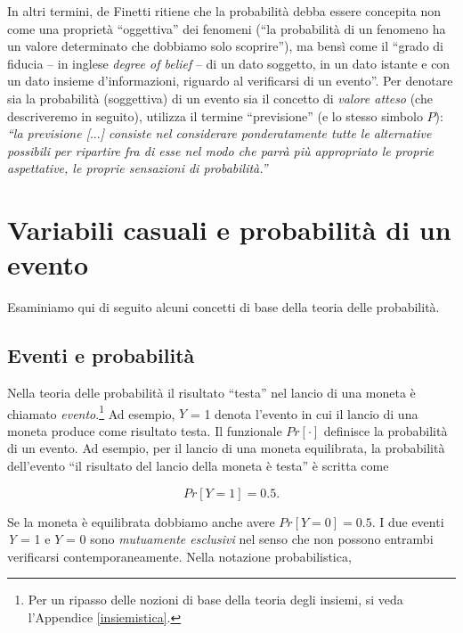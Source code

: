 \documentclass[
  11pt,
]{krantz}
\theoremstyle{definition}
\theoremstyle{definition}
\theoremstyle{definition}
\theoremstyle{definition}
\theoremstyle{remark}
\begin{document}
In altri termini, de Finetti ritiene che la probabilità debba essere concepita non come una proprietà ``oggettiva'' dei fenomeni (``la probabilità di un fenomeno ha un valore determinato che dobbiamo solo scoprire''), ma bensì come il ``grado di fiducia -- in inglese \emph{degree of belief} -- di un dato soggetto, in un dato istante e con un dato insieme d'informazioni, riguardo al verificarsi di un evento''. Per denotare sia la probabilità (soggettiva) di un evento sia il concetto di \emph{valore atteso} (che descriveremo in seguito), \citet{definetti1970teoria} utilizza il termine ``previsione'' (e lo stesso simbolo \(P\)): \emph{``la previsione {[}\(\dots\){]} consiste nel considerare ponderatamente tutte le alternative possibili per ripartire fra di esse nel modo che parrà più appropriato le proprie aspettative, le proprie sensazioni di probabilità.''}

\hypertarget{variabili-casuali-e-probabilituxe0-di-un-evento}{%
\section{Variabili casuali e probabilità di un evento}\label{variabili-casuali-e-probabilituxe0-di-un-evento}}

Esaminiamo qui di seguito alcuni concetti di base della teoria delle probabilità.

\hypertarget{eventi-e-probabilituxe0}{%
\subsection{Eventi e probabilità}\label{eventi-e-probabilituxe0}}

Nella teoria delle probabilità il risultato ``testa'' nel lancio di una moneta è chiamato \emph{evento}.\footnote{Per un ripasso delle nozioni di base della teoria degli insiemi, si veda l'Appendice \ref{insiemistica}.} Ad esempio, \(Y\) = 1 denota l'evento in cui il lancio di una moneta produce come risultato testa. Il funzionale \(Pr[·]\) definisce la probabilità di un evento. Ad esempio, per il lancio di una moneta equilibrata, la probabilità dell'evento ``il risultato del lancio della moneta è testa'' è scritta come

\[
Pr[Y = 1] = 0.5.
\]

Se la moneta è equilibrata dobbiamo anche avere \(Pr[Y = 0] = 0.5\). I due eventi \emph{Y} = 1 e \(Y\) = 0 sono \emph{mutuamente esclusivi} nel senso che non possono entrambi verificarsi contemporaneamente. Nella notazione probabilistica,
\end{document}
